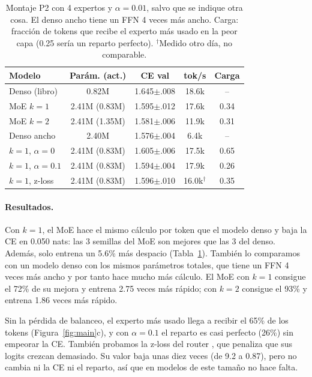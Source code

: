\documentclass[11pt]{article}
\newcommand{\pmsd}[1]{{\scriptsize$\pm$#1}}
\begin{document}
\begin{table}[t]
\centering\small\setlength{\tabcolsep}{2.5pt}
\begin{tabular}{@{}lcccc@{}}
\toprule
Modelo & Parám. (act.) & CE val & tok/s & Carga \\
\midrule
Denso (libro) & 0.82M & 1.645\pmsd{.008} & 18.6k & -- \\
MoE $k{=}1$ & 2.41M (0.83M) & 1.595\pmsd{.012} & 17.6k & 0.34 \\
MoE $k{=}2$ & 2.41M (1.35M) & 1.581\pmsd{.006} & 11.9k & 0.31 \\
Denso ancho & 2.40M & 1.576\pmsd{.004} & 6.4k & -- \\
\midrule
$k{=}1$, $\alpha{=}0$ & 2.41M (0.83M) & 1.605\pmsd{.006} & 17.5k & 0.65 \\
$k{=}1$, $\alpha{=}0.1$ & 2.41M (0.83M) & 1.594\pmsd{.004} & 17.9k & 0.26 \\
$k{=}1$, z-loss & 2.41M (0.83M) & 1.596\pmsd{.010} & 16.0k$^\dagger$ & 0.35 \\
\bottomrule
\end{tabular}
\caption{Montaje P2 con 4 expertos y $\alpha{=}0.01$, salvo que se indique otra cosa. El denso ancho tiene un FFN 4 veces más ancho. Carga: fracción de tokens que recibe el experto más usado en la peor capa (0.25 sería un reparto perfecto). $^\dagger$Medido otro día, no comparable.}
\label{tab:moe}
\end{table}

\paragraph{Resultados.}
Con $k=1$, el MoE hace el mismo cálculo por token que el modelo denso y baja la CE en 0.050 nats: las 3 semillas del MoE son mejores que las 3 del denso. Además, solo entrena un 5.6\% más despacio (Tabla~\ref{tab:moe}).
También lo comparamos con un modelo denso con los mismos parámetros totales, que tiene un FFN 4 veces más ancho y por tanto hace mucho más cálculo.
El MoE con $k=1$ consigue el 72\% de su mejora y entrena 2.75 veces más rápido; con $k=2$ consigue el 93\% y entrena 1.86 veces más rápido.

Sin la pérdida de balanceo, el experto más usado llega a recibir el 65\% de los tokens (Figura~\ref{fig:main}c), y con $\alpha=0.1$ el reparto es casi perfecto (26\%) sin empeorar la CE.
También probamos la z-loss del router \citep{zoph2022stmoe}, que penaliza que sus logits crezcan demasiado.
Su valor baja unas diez veces (de 9.2 a 0.87), pero no cambia ni la CE ni el reparto, así que en modelos de este tamaño no hace falta.
\end{document}
